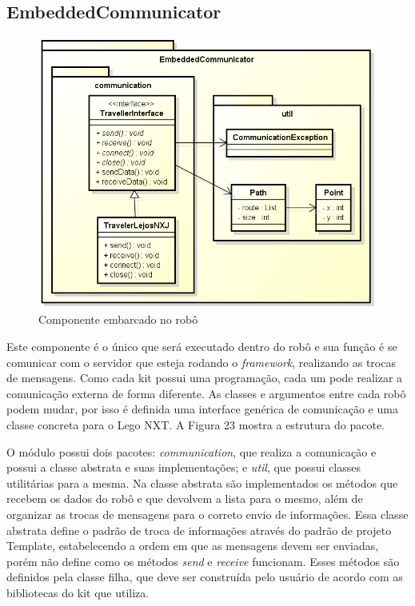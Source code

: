 \subsection{EmbeddedCommunicator}

\begin{figure}[h]
	\centering
	\label{fig23}
		\includegraphics[keepaspectratio=true,scale=0.5]{figuras/embedded.png}
	\caption{Componente embarcado no robô}
\end{figure}

Este componente é o único que será executado dentro do robô e sua função é se comunicar com o servidor que esteja rodando o \textit{framework}, realizando as trocas de mensagens. Como cada kit possui uma programação, cada um pode realizar a comunicação externa de forma diferente. As classes e argumentos entre cada robô podem mudar, por isso é definida uma interface genérica de comunicação e uma classe concreta para o Lego NXT. A Figura 23 mostra a estrutura do pacote.

O módulo possui dois pacotes: \textit{communication}, que realiza a comunicação e possui a classe abstrata e suas implementações; e \textit{util}, que possui classes utilitárias para a mesma. Na classe abstrata são implementados os métodos que recebem os dados do robô e que devolvem a lista para o mesmo, além de organizar as trocas de mensagens para o correto envio de informações. Essa classe abstrata define o padrão de troca de informações através do padrão de projeto Template, estabelecendo a ordem em que as mensagens devem ser enviadas, porém não define como os métodos \textit{send} e \textit{receive} funcionam. Esses métodos são definidos pela classe filha, que deve ser construída pelo usuário de acordo com as bibliotecas do kit que utiliza.

